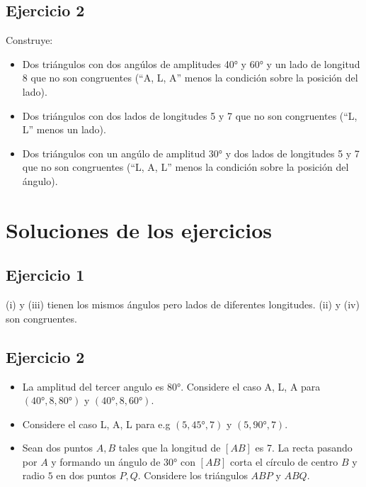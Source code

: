 \subsection{Ejercicio 2}

Construye:

\begin{itemize}
\item Dos triángulos con dos angúlos de amplitudes 40° y 60° y un lado de
  longitud 8 que no son congruentes (``A, L, A'' menos la condición sobre
  la posición del lado).
\item Dos triángulos con dos lados de longitudes 5 y 7 que no son congruentes
  (``L, L'' menos un lado).
\item Dos triángulos con un angúlo de amplitud 30° y dos lados de
  longitudes 5 y 7 que no son congruentes (``L, A, L'' menos la condición sobre
  la posición del ángulo).
\end{itemize}

\section{Soluciones de los ejercicios}

\subsection{Ejercicio 1}

(i) y (iii) tienen los mismos ángulos pero lados de diferentes longitudes.
(ii) y (iv) son congruentes.

\subsection{Ejercicio 2}

\begin{itemize}
\item La amplitud del tercer angulo es 80°. Considere el caso A, L, A
  para $(40°,8,80°)$ y $(40°,8,60°)$.
\item Considere el caso L, A, L para e.g $(5,45°,7)$ y $(5,90°,7)$.
\item Sean dos puntos $A, B$ tales que la longitud de $[AB]$ es 7. La recta
  pasando por $A$ y formando un ángulo de $30°$ con $[AB]$ corta el círculo
  de centro $B$ y radio $5$ en dos puntos $P, Q$. Considere los
  triángulos $ABP$ y $ABQ$.
\end{itemize}
